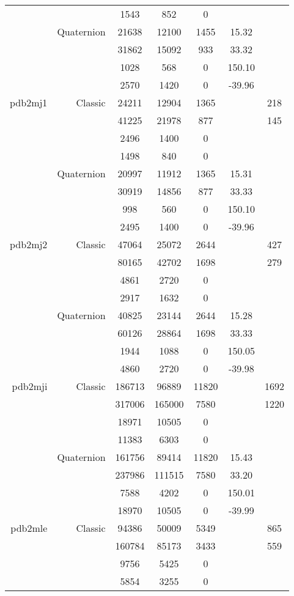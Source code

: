 \begin{xltabular}{\textwidth}{r|rcccSc}
& & 1543 & 852 & 0 & & \\
& Quaternion & 21638 & 12100 & 1455 & 15.32 & \\
& & 31862 & 15092 & 933 & 33.32 & \\
& & 1028 & 568 & 0 & 150.10 & \\
& & 2570 & 1420 & 0 & -39.96 & \\ \addlinespace
pdb2mj1 & Classic & 24211 & 12904 & 1365 & & 218 \\
& & 41225 & 21978 & 877 & & 145 \\
& & 2496 & 1400 & 0 & & \\
& & 1498 & 840 & 0 & & \\
& Quaternion & 20997 & 11912 & 1365 & 15.31 & \\
& & 30919 & 14856 & 877 & 33.33 & \\
& & 998 & 560 & 0 & 150.10 & \\
& & 2495 & 1400 & 0 & -39.96 & \\ \addlinespace
pdb2mj2 & Classic & 47064 & 25072 & 2644 & & 427 \\
& & 80165 & 42702 & 1698 & & 279 \\
& & 4861 & 2720 & 0 & & \\
& & 2917 & 1632 & 0 & & \\
& Quaternion & 40825 & 23144 & 2644 & 15.28 & \\
& & 60126 & 28864 & 1698 & 33.33 & \\
& & 1944 & 1088 & 0 & 150.05 & \\
& & 4860 & 2720 & 0 & -39.98 & \\ \addlinespace
pdb2mji & Classic & 186713 & 96889 & 11820 & & 1692 \\
& & 317006 & 165000 & 7580 & & 1220 \\
& & 18971 & 10505 & 0 & & \\
& & 11383 & 6303 & 0 & & \\
& Quaternion & 161756 & 89414 & 11820 & 15.43 & \\
& & 237986 & 111515 & 7580 & 33.20 & \\
& & 7588 & 4202 & 0 & 150.01 & \\
& & 18970 & 10505 & 0 & -39.99 & \\ \addlinespace
pdb2mle & Classic & 94386 & 50009 & 5349 & & 865 \\
& & 160784 & 85173 & 3433 & & 559 \\
& & 9756 & 5425 & 0 & & \\
& & 5854 & 3255 & 0 & & \\

\end{xltabular}
